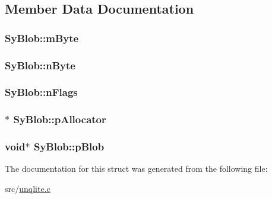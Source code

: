 \subsection{Member Data Documentation}
\hypertarget{struct_sy_blob_af36d6cce43a9616c99100ee055808405}{
\subsubsection[{m\-Byte}]{ Sy\-Blob\-::m\-Byte}}\label{db/ddd/struct_sy_blob_af36d6cce43a9616c99100ee055808405}
\hypertarget{struct_sy_blob_a832e445f58f5869ec137d43ca5cc7933}{
\subsubsection[{n\-Byte}]{ Sy\-Blob\-::n\-Byte}}\label{db/ddd/struct_sy_blob_a832e445f58f5869ec137d43ca5cc7933}
\hypertarget{struct_sy_blob_a021fe903f77cc88a30bec3022a5e700a}{
\subsubsection[{n\-Flags}]{ Sy\-Blob\-::n\-Flags}}\label{db/ddd/struct_sy_blob_a021fe903f77cc88a30bec3022a5e700a}
\hypertarget{struct_sy_blob_a8e555bac66544a516dbb0db474212bb8}{
\subsubsection[{p\-Allocator}]{$\ast$ Sy\-Blob\-::p\-Allocator}}\label{db/ddd/struct_sy_blob_a8e555bac66544a516dbb0db474212bb8}
\hypertarget{struct_sy_blob_a2ca433ab8d862b22e0d7b0d905b1cb03}{
\subsubsection[{p\-Blob}]{\setlength{\rightskip}{0pt plus 5cm}void$\ast$ Sy\-Blob\-::p\-Blob}}\label{db/ddd/struct_sy_blob_a2ca433ab8d862b22e0d7b0d905b1cb03}


The documentation for this struct was generated from the following file\-:\begin{DoxyCompactItemize}
\item 
src/\hyperlink{unqlite_8c}{unqlite.\-c}\end{DoxyCompactItemize}

